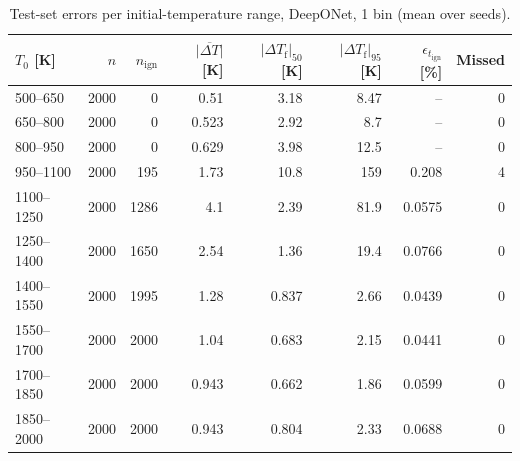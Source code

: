 \begin{table}[htbp]
    \centering
    \small
    \begin{tabular}{lrrrrrrr}
        \hline
        $T_0$ [K] & $n$ & $n_\mathrm{ign}$ & $\overline{|\Delta T|}$ [K] & $|\Delta T_\mathrm{f}|_{50}$ [K] & $|\Delta T_\mathrm{f}|_{95}$ [K] & $\epsilon_{t_\mathrm{ign}}$ [\%] & Missed \\
        \hline
        500--650 & 2000 & 0 & 0.51 & 3.18 & 8.47 & -- & 0 \\
        650--800 & 2000 & 0 & 0.523 & 2.92 & 8.7 & -- & 0 \\
        800--950 & 2000 & 0 & 0.629 & 3.98 & 12.5 & -- & 0 \\
        950--1100 & 2000 & 195 & 1.73 & 10.8 & 159 & 0.208 & 4 \\
        1100--1250 & 2000 & 1286 & 4.1 & 2.39 & 81.9 & 0.0575 & 0 \\
        1250--1400 & 2000 & 1650 & 2.54 & 1.36 & 19.4 & 0.0766 & 0 \\
        1400--1550 & 2000 & 1995 & 1.28 & 0.837 & 2.66 & 0.0439 & 0 \\
        1550--1700 & 2000 & 2000 & 1.04 & 0.683 & 2.15 & 0.0441 & 0 \\
        1700--1850 & 2000 & 2000 & 0.943 & 0.662 & 1.86 & 0.0599 & 0 \\
        1850--2000 & 2000 & 2000 & 0.943 & 0.804 & 2.33 & 0.0688 & 0 \\
        \hline
    \end{tabular}
    \caption{Test-set errors per initial-temperature range, DeepONet, 1 bin (mean over seeds).}
    \label{tab:T0_deeponet_predicted_b1}
\end{table}
